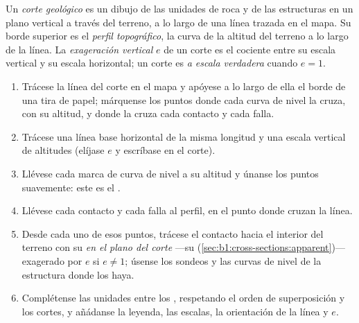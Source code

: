 \begin{definition}\label{def:b1:cross-sections:section}
Un \emph{corte geológico} es un dibujo de las unidades de roca y de las
estructuras en un plano vertical a través del terreno, a lo largo de una línea trazada en el mapa.
Su borde superior es el \emph{perfil topográfico}, la curva de la altitud
del terreno a lo largo de la línea. La \emph{exageración vertical} $e$
de un corte es el cociente entre su escala vertical y su escala horizontal; un corte es
\emph{a escala verdadera} cuando $e = 1$.
\end{definition}

\begin{method}\label{met:b1:cross-sections:construct}
\begin{enumerate}
  \item Trácese la línea del corte en el mapa y apóyese a lo largo de ella el borde de una tira de
        papel; márquense los puntos donde cada curva de nivel la cruza, con su altitud, y donde la
        cruza cada contacto y cada falla.
  \item Trácese una línea base horizontal de la misma longitud y una escala vertical de altitudes
        (elíjase $e$ y escríbase en el corte).
  \item Llévese cada marca de curva de nivel a su altitud y únanse los puntos suavemente: este es el
        .
  \item Llévese cada contacto y cada falla al perfil, en el punto donde cruzan la línea.
  \item Desde cada uno de esos puntos, trácese el contacto hacia el interior del terreno con su
         \emph{en el plano del corte} ---su 
        (\cref{sec:b1:cross-sections:apparent})--- exagerado por $e$ si $e \ne 1$; úsense los
        sondeos y las curvas de nivel de la estructura donde los haya.
  \item Complétense las unidades entre los , respetando el orden de superposición y los
        cortes, y añádanse la leyenda, las escalas, la orientación de la línea y $e$.
\end{enumerate}
\end{method}

